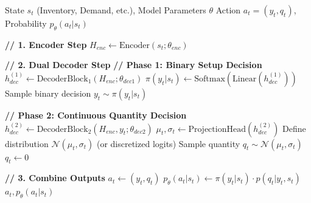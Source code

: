\begin{algorithm}[hbt!]
\caption{Forward Pass of Encoder-Dual Decoder Architecture}
\label{alg:dual_decoder_forward}
\begin{algorithmic}[1]
    \Require State $s_t$ (Inventory, Demand, etc.), Model Parameters $\theta$
    \Ensure Action $a_t = (y_t, q_t)$, Probability $p_\theta(a_t|s_t)$
    
    \State \textbf{// 1. Encoder Step}
    \State $H_{enc} \leftarrow \text{Encoder}(s_t; \theta_{enc})$ 
    
    \State \textbf{// 2. Dual Decoder Step}
    \State \textbf{// Phase 1: Binary Setup Decision}
    \State $h_{dec}^{(1)} \leftarrow \text{DecoderBlock}_1(H_{enc}; \theta_{dec1})$
    \State $\pi(y_t|s_t) \leftarrow \text{Softmax}(\text{Linear}(h_{dec}^{(1)}))$
    \State Sample binary decision $y_t \sim \pi(y_t|s_t)$
    
    \State \textbf{// Phase 2: Continuous Quantity Decision}
     
        \State $h_{dec}^{(2)} \leftarrow \text{DecoderBlock}_2(H_{enc}, y_t; \theta_{dec2})$
        \State $\mu_t, \sigma_t \leftarrow \text{ProjectionHead}(h_{dec}^{(2)})$
        \State Define distribution $\mathcal{N}(\mu_t, \sigma_t)$ (or discretized logits)
        \State Sample quantity $q_t \sim \mathcal{N}(\mu_t, \sigma_t)$
    \Else
        \State $q_t \leftarrow 0$
    \EndIf
    
    \State \textbf{// 3. Combine Outputs}
    \State $a_t \leftarrow (y_t, q_t)$
    \State $p_\theta(a_t|s_t) \leftarrow \pi(y_t|s_t) \cdot p(q_t|y_t, s_t)$
    \State \Return $a_t, p_\theta(a_t|s_t)$
\end{algorithmic}
\end{algorithm}